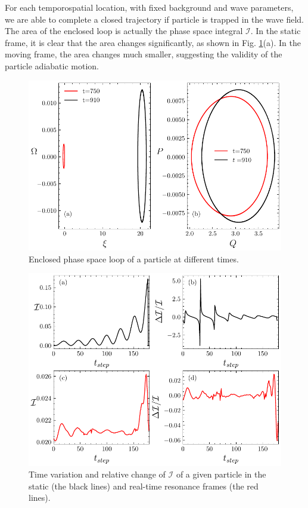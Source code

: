 For each temporospatial location, with fixed background and wave parameters, we are able to complete a closed trajectory if particle is  trapped in the wave field.  
The area of the enclosed loop is actually the phase space integral $\mathcal{I}$.
In the static frame, it is clear that the area changes significantly,
as shown in Fig. \ref{fig.area}(a). In the moving frame, the area changes much smaller, suggesting the validity of the particle adiabatic motion. 
\begin{figure}
    \centering
    \includegraphics[scale=0.5]{img/area.pdf}
    \caption{Enclosed phase space loop of a particle at different times.
    \label{fig.area}
    }
\end{figure}
\begin{figure}
    \centering
    \includegraphics[scale=0.5]{img/adiaI.pdf}
    \caption{Time variation and 
relative change
     of $\mathcal{I}$ of a given particle in the static (the black lines) and  real-time resonance  frames (the red lines).  
    }
    \label{fig.I}
\end{figure}
